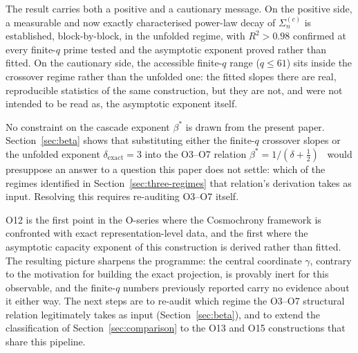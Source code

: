   The result carries both a positive and a cautionary message.
  On the positive side, a measurable and now exactly characterised power-law decay of
  $\Sigma_n^{(c)}$ is established, block-by-block, in the unfolded regime, with $R^2 > 0.98$
  confirmed at every finite-$q$ prime tested and the asymptotic exponent proved rather than
  fitted.
  On the cautionary side, the accessible finite-$q$ range ($q \leq 61$) sits inside the
  crossover regime rather than the unfolded one: the fitted slopes there are real,
  reproducible statistics of the same construction, but they are not, and were not intended
  to be read as, the asymptotic exponent itself.

  No constraint on the cascade exponent $\beta^*$ is drawn from the present paper.
  Section~\ref{sec:beta} shows that substituting either the finite-$q$ crossover slopes or
  the unfolded exponent $\delta_{\mathrm{exact}}=3$ into the O3--O7 relation
  $\beta^*=1/(\delta+\tfrac12)$~\cite{Beau2026a11} would presuppose an answer to a question
  this paper does not settle: which of the regimes identified in
  Section~\ref{sec:three-regimes} that relation's derivation takes as input.
  Resolving this requires re-auditing O3--O7 itself.

  O12 is the first point in the O-series where the Cosmochrony framework is confronted with
  exact representation-level data, and the first where the asymptotic capacity exponent of
  this construction is derived rather than fitted.
  The resulting picture sharpens the programme: the central coordinate $\gamma$, contrary to
  the motivation for building the exact projection, is provably inert for this observable,
  and the finite-$q$ numbers previously reported carry no evidence about it either way.
  The next steps are to re-audit which regime the O3--O7 structural relation legitimately
  takes as input (Section~\ref{sec:beta}), and to extend the classification of
  Section~\ref{sec:comparison} to the O13 and O15 constructions that share this pipeline.
